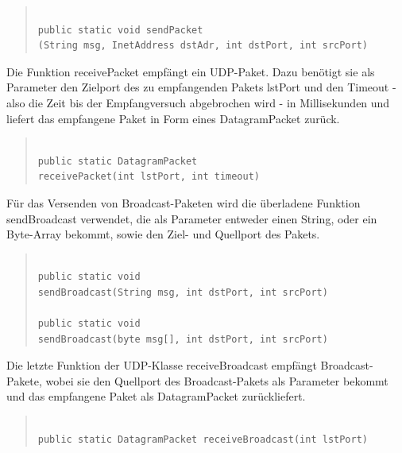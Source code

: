 \documentclass[a4paper,14pt,headsepline]{scrartcl}
\begin{document}
\begin{quote}
\begin{verbatim}

public static void sendPacket
(String msg, InetAddress dstAdr, int dstPort, int srcPort) 

\end{verbatim}
\end{quote}

Die Funktion receivePacket empfängt ein UDP-Paket. Dazu benötigt sie als Parameter den Zielport des zu empfangenden Pakets lstPort und den Timeout - also die Zeit bis der Empfangversuch abgebrochen wird - in Millisekunden und liefert das empfangene Paket in Form eines DatagramPacket zurück.

\begin{quote}
\begin{verbatim}

public static DatagramPacket 
receivePacket(int lstPort, int timeout)

\end{verbatim}
\end{quote}

\newpage

Für das Versenden von Broadcast-Paketen wird die überladene Funktion sendBroadcast verwendet, die als Parameter entweder einen String, oder ein Byte-Array bekommt, sowie den Ziel- und Quellport des Pakets.

\begin{quote}
\begin{verbatim}

public static void 
sendBroadcast(String msg, int dstPort, int srcPort)

public static void 
sendBroadcast(byte msg[], int dstPort, int srcPort)

\end{verbatim}
\end{quote}

Die letzte Funktion der UDP-Klasse receiveBroadcast empfängt Broadcast-Pakete, wobei sie den Quellport des Broadcast-Pakets als Parameter bekommt und das empfangene Paket als DatagramPacket zurückliefert.

\begin{quote}
\begin{verbatim}

public static DatagramPacket receiveBroadcast(int lstPort)

\end{verbatim}
\end{quote}
\end{document}
